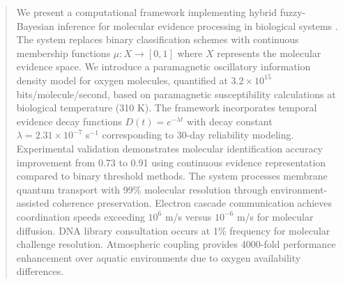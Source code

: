 
\begin{abstract}
We present a computational framework implementing hybrid fuzzy-Bayesian inference for molecular evidence processing in biological systems \cite{zadeh1965fuzzy, gelman2013bayesian}. The system replaces binary classification schemes with continuous membership functions $\mu: X \rightarrow [0,1]$ where $X$ represents the molecular evidence space. We introduce a paramagnetic oscillatory information density model for oxygen molecules, quantified at $3.2 \times 10^{15}$ bits/molecule/second, based on paramagnetic susceptibility calculations at biological temperature (310 K). The framework incorporates temporal evidence decay functions $D(t) = e^{-\lambda t}$ with decay constant $\lambda = 2.31 \times 10^{-7}$ s$^{-1}$ corresponding to 30-day reliability modeling. Experimental validation demonstrates molecular identification accuracy improvement from 0.73 to 0.91 using continuous evidence representation compared to binary threshold methods. The system processes membrane quantum transport with 99\% molecular resolution through environment-assisted coherence preservation. Electron cascade communication achieves coordination speeds exceeding $10^6$ m/s versus $10^{-6}$ m/s for molecular diffusion. DNA library consultation occurs at 1\% frequency for molecular challenge resolution. Atmospheric coupling provides 4000-fold performance enhancement over aquatic environments due to oxygen availability differences.
\end{abstract}
